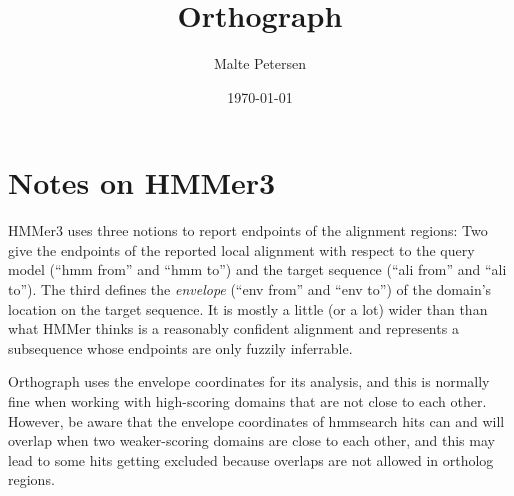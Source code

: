 \documentclass[a4paper]{scrartcl}
\title{Orthograph}
\author{Malte Petersen}
\date{\today}
\begin{document}
\maketitle
\tableofcontents
\section{Notes on HMMer3}

HMMer3 uses three notions to report endpoints of the alignment regions: Two
give the endpoints of the reported local alignment with respect to the query
model (``hmm from'' and ``hmm to'') and the target sequence (``ali from'' and
``ali to''). The third defines the \emph{envelope} (``env from'' and ``env to'')
of the domain's location on the target sequence. It is mostly a little (or a
lot) wider than than what HMMer thinks is a reasonably confident alignment and
represents a subsequence whose endpoints are only fuzzily inferrable.

Orthograph uses the envelope coordinates for its analysis, and this is normally
fine when working with high-scoring domains that are not close to each other.
However, be aware that the envelope coordinates of hmmsearch hits can and will
overlap when two weaker-scoring domains are close to each other, and this may
lead to some hits getting excluded because overlaps are not allowed in ortholog
regions. 
\end{document}
